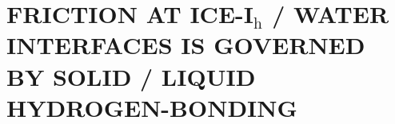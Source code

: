 
\newcommand*{\citen}[1]{%
  \begingroup
    \romannumeral-`\x %
    \setcitestyle{numbers}%
    \cite{#1}%
  \endgroup   
}



% 


\chapter{FRICTION AT ICE-I$_\mathrm{h}$ / WATER INTERFACES IS GOVERNED BY SOLID / LIQUID HYDROGEN-BONDING}

